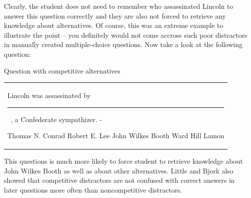 \documentclass[a4paper, 12pt, twoside]{fithesis2}		%
\renewcommand{\_}{\leavevmode \kern0.07em\vbox{\hrule width0.4em}}
\newcounter{choice}
\renewcommand\thechoice{\Alph{choice}}
\newcommand\choicelabel{\thechoice.}
\newenvironment{choices}%
  {\vspace{0.8em}\list{\choicelabel}%
     {\usecounter{choice}\def\makelabel##1{\hss\llap{##1}}%
       \settowidth{\leftmargin}{W.\hskip\labelsep\hskip 0.01em}%
       \def\choice{%
         \item
       } %
       \labelwidth\leftmargin\advance\labelwidth-\labelsep
       \topsep=0pt
       \partopsep=0pt
     }%
  }%
  {\vspace{-0.7em}\endlist}
\newenvironment{question}
{
  \begin{center}
  \vspace{-0.5em}
  \begin{tabular}{p{0.9\textwidth}}
}
{
  \\
  \end{tabular}
  \vspace{-1em}
  \end{center}
}
\newcommand{\sentenceGap}{\rule{1.5cm}{0.4pt}~}
\begin{document}
Clearly, the student does not need to remember who assassinated Lincoln to answer this question correctly and they are also not forced to retrieve any knowledge about alternatives.
Of course, this was an extreme example to illustrate the point -- you definitely would not come accross such poor distractors in manually created multiple-choice questions.
Now take a look at the following question:

\begin{exercise}
\caption{Question with competitive alternatives}%
  \begin{question}
  Lincoln was assassinated by \sentenceGap , a Confederate sympathizer.
  \begin{choices}
    \choice Thomas N. Conrad
    \choice Robert E. Lee
    \choice John Wilkes Booth
    \choice Ward Hill Lamon
  \end{choices}
  \end{question}
\end{exercise}

This questions is much more likely to force student to retrieve knowledge about John Wilkes Booth as well as about other alternatives.
Little and Bjork also showed that competitive distractors are not confused with correct answers in later questions more often than noncompetitive distractors.
\end{document}

